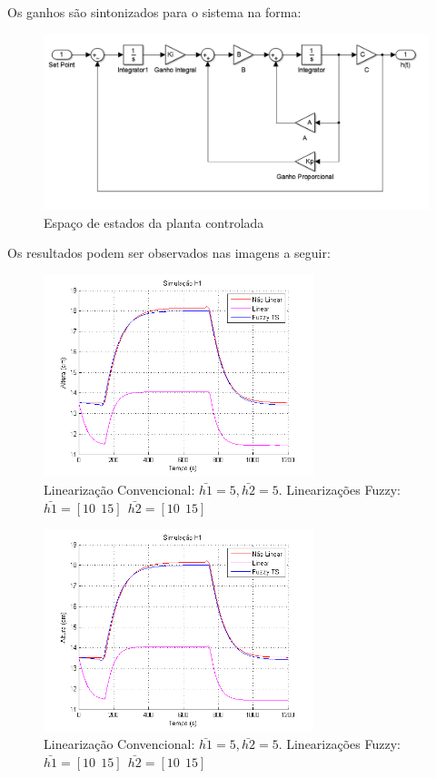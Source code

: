 Os ganhos são sintonizados para o sistema na forma:
\begin{figure}[H]
	\begin{centering}
		\includegraphics[width=\textwidth]{img/modelo_controlado.png}
		\par\end{centering}
	\caption{\label{figPlantCtrl}Espaço de estados da planta controlada}
\end{figure}

Os resultados podem ser observados nas imagens a seguir:
\begin{figure}[H]
	\centering
	\includegraphics[width=0.7\textwidth]{img/FM_h1_5_10_15.png}
	\caption{\small Linearização Convencional: $ \bar{h1}=5, \bar{h2}=5$. Linearizações Fuzzy: $\bar{h1}=[10 \ \ 15] \ \ \bar{h2}=[10 \ \ 15]$ }
	\label{figH1TSCtrl2}
\end{figure}

\begin{figure}[H]
	\centering
	\includegraphics[width=0.7\textwidth]{img/FM_h1_5_10_15.png}
	\caption{\small Linearização Convencional: $ \bar{h1}=5, \bar{h2}=5$. Linearizações Fuzzy: $\bar{h1}=[10 \ \ 15] \ \ \bar{h2}=[10 \ \ 15]$ }
	\label{figH2CtrlTS2}
\end{figure}

